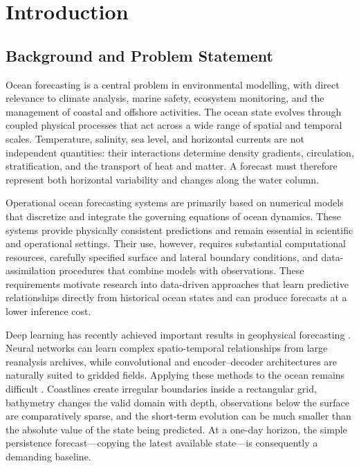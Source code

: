 \chapter{Introduction}
\label{chap:introduction}

\section{Background and Problem Statement}

Ocean forecasting is a central problem in environmental modelling, with direct relevance to climate analysis, marine safety, ecosystem monitoring, and the management of coastal and offshore activities. The ocean state evolves through coupled physical processes that act across a wide range of spatial and temporal scales. Temperature, salinity, sea level, and horizontal currents are not independent quantities: their interactions determine density gradients, circulation, stratification, and the transport of heat and matter. A forecast must therefore represent both horizontal variability and changes along the water column.

Operational ocean forecasting systems are primarily based on numerical models that discretize and integrate the governing equations of ocean dynamics. These systems provide physically consistent predictions and remain essential in scientific and operational settings. Their use, however, requires substantial computational resources, carefully specified surface and lateral boundary conditions, and data-assimilation procedures that combine models with observations. These requirements motivate research into data-driven approaches that learn predictive relationships directly from historical ocean states and can produce forecasts at a lower inference cost.

Deep learning has recently achieved important results in geophysical forecasting \citep{bi2023pangu,lam2023graphcast}. Neural networks can learn complex spatio-temporal relationships from large reanalysis archives, while convolutional and encoder--decoder architectures are naturally suited to gridded fields. Applying these methods to the ocean remains difficult \citep{epicoco2026medformer}. Coastlines create irregular boundaries inside a rectangular grid, bathymetry changes the valid domain with depth, observations below the surface are comparatively sparse, and the short-term evolution can be much smaller than the absolute value of the state being predicted. At a one-day horizon, the simple persistence forecast---copying the latest available state---is consequently a demanding baseline.

